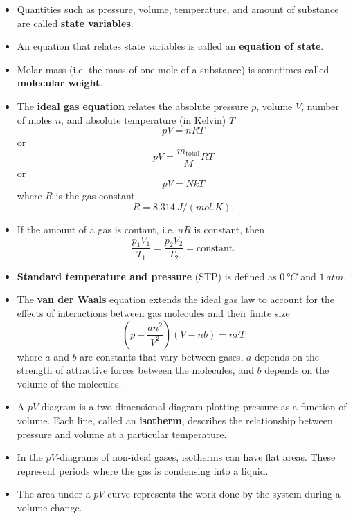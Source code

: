 \documentclass{article}
\begin{document}
\begin{itemize}
  \item Quantities such as pressure, volume, temperature, and amount of substance are called \textbf{state variables}.

  \item An equation that relates state variables is called an \textbf{equation of state}.

  \item Molar mass (i.e. the mass of one mole of a substance) is sometimes called \textbf{molecular weight}.

\item The \textbf{ideal gas equation} relates the absolute pressure $p$, volume $V$, number of moles $n$, and absolute temperature (in Kelvin) $T$ \[p V = n R T\] or \[p V = \frac{m_\text{total}}{M} RT\] or \[p V = N k T\] where $R$ is the gas constant \[R = \qty{8.314}{J/(mol.K)}.\]

  \item If the amount of a gas is contant, i.e. $n R$ is constant, then \[\frac{p_1 V_1}{T_1} = \frac{p_2 V_2}{T_2} = \text{constant}.\]

  \item \textbf{Standard temperature and pressure} (STP) is defined as $\qty{0}{\degree C}$ and $\qty{1}{atm}$.

  \item The \textbf{van der Waals} equation extends the ideal gas law to account for the effects of interactions between gas molecules and their finite size \[\left( p + \frac{a n^2}{V^2} \right) (V - n b) = n r T\] where $a$ and $b$ are constants that vary between gases, $a$ depends on the strength of attractive forces between the molecules, and $b$ depends on the volume of the molecules.

  \item A $p V$-diagram is a two-dimensional diagram plotting pressure as a function of volume. Each line, called an \textbf{isotherm}, describes the relationship between pressure and volume at a particular temperature.

  \item In the $p V$-diagrams of non-ideal gases, isotherms can have flat areas. These represent periods where the gas is condensing into a liquid.

  \item The area under a $p V$-curve represents the work done by the system during a volume change.
\end{itemize}
\end{document}
